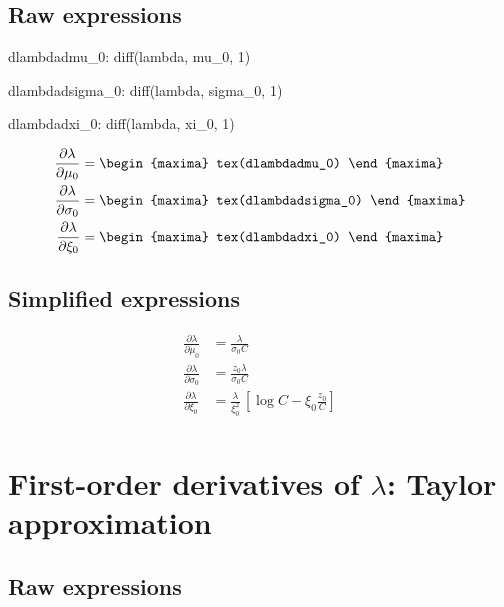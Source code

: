 \subsection*{Raw expressions}

\begin{maxima}
  dlambdadmu_0: diff(lambda, mu_0, 1)
\end{maxima}
\begin{maxima}
  dlambdadsigma_0: diff(lambda, sigma_0, 1)
\end{maxima}
\begin{maxima}
  dlambdadxi_0: diff(lambda, xi_0, 1)
\end{maxima}

{\color{MonVertF}
\begin{align*}
  \frac{\partial{\lambda}}{\partial \mu_0}
  &=
\begin{maxima}
  tex(dlambdadmu_0)
\end{maxima}\\
 \frac{\partial{\lambda}}{\partial \sigma_0}
  &=
\begin{maxima}
  tex(dlambdadsigma_0)
\end{maxima}\\
\frac{\partial{\lambda}}{\partial \xi_0}
  &=
\begin{maxima}
  tex(dlambdadxi_0)
\end{maxima}
\end{align*}
}

\subsection*{Simplified expressions}

{\color{red}
\begin{align*}
  \frac{\partial{\lambda}}{\partial \mu_0}
  &= \frac{\lambda}{\sigma_0 C} \\
 \frac{\partial{\lambda}}{\partial \sigma_0}
  &=
 \frac{z_0 \lambda}{\sigma_0 C}\\
\frac{\partial{\lambda}}{\partial \xi_0}
  &=  \frac{\lambda}{\xi_0^2} \, \left[ \log C - \xi_0 \frac{z_0}{C} \right]\\
\end{align*}
}

\section{First-order derivatives of $\lambda$: Taylor approximation}


\subsection*{Raw expressions}

